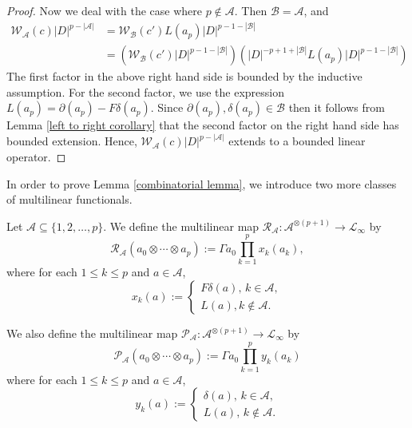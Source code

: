 \begin{proof}
        Now we deal with the case where $p\notin \mathscr{A}$. Then $\mathscr{B} = \mathscr{A}$, and
        \begin{align*}
            \mathcal{W}_{\mathscr{A}}(c)|D|^{p-|\mathscr{A}|} &= \mathcal{W}_{\mathscr{B}}(c')L(a_p)|D|^{p-1-|\mathscr{B}|}\\
                                      &= \left(\mathcal{W}_{\mathscr{B}}(c')|D|^{p-1-|\mathscr{B}|}\right)\left(|D|^{-p+1+|\mathscr{B}|}L(a_p)|D|^{p-1-|\mathscr{B}|}\right)
        \end{align*}
        The first factor in the above right hand side is bounded by the inductive assumption. For the second factor, we use the expression $L(a_p) = \partial(a_p)-F\delta(a_p)$.
        Since $\partial(a_p), \delta(a_p) \in \mathcal{B}$ then it follows from Lemma \ref{left to right corollary} that the second factor on the right hand side has bounded extension. Hence, $\mathcal{W}_{\mathscr{A}}(c)|D|^{p-|\mathscr{A}|}$
        extends to a bounded linear operator. 
        
    \end{proof}

    In order to prove Lemma \ref{combinatorial lemma}, we introduce two more classes of multilinear functionals.
    \begin{defi}
        Let $\mathscr{A} \subseteq \{1,2,\ldots,p\}$. We define the multilinear map $\mathcal{R}_{\mathscr{A}}:\mathcal{A}^{\otimes(p+1)}\to \mathcal{L}_{\infty}$ by
        \begin{equation*}
            \mathcal{R}_{\mathscr{A}}(a_0\otimes\cdots\otimes a_p) := \Gamma a_0\prod_{k=1}^px_k(a_k),    
        \end{equation*}
        where for each $1\leq k \leq p$ and $a \in \mathcal{A}$,
        \begin{equation*}
            x_k(a) := \begin{cases}
                        F\delta(a),\,k \in \mathscr{A},\\
                        L(a), k \notin \mathscr{A}.
                   \end{cases}
        \end{equation*}
        
        We also define the multilinear map $\mathcal{P}_{\mathscr{A}}:\mathcal{A}^{\otimes(p+1)}\to \mathcal{L}_{\infty}$ by
        \begin{equation*}
            \mathcal{P}_{\mathscr{A}}(a_0\otimes \cdots\otimes a_p) := \Gamma a_0\prod_{k=1}^p y_k(a_k)
        \end{equation*}
        where for each $1\leq k \leq p$ and $a \in \mathcal{A}$,
        \begin{equation*}
            y_k(a) := \begin{cases}
                        \delta(a),\,k \in \mathscr{A},\\
                        L(a),\, k\notin \mathscr{A}.
                   \end{cases}
        \end{equation*}
    \end{defi}



